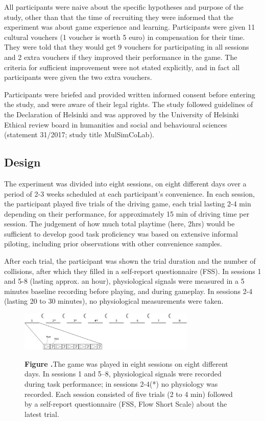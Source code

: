 \documentclass{frontierstyle/frontiersSCNS}
\newcommand{\nicewidth}{0.75\textwidth}
\newcommand{\tapprx}{\raisebox{0.4ex}{\texttildelow}}
\begin{document}
All participants were naive about the specific hypotheses and purpose of the study, other than that the time of recruiting they were informed that the experiment was about game experience and learning. Participants were given 11 cultural vouchers (1 voucher is worth 5 euro) in compensation for their time. They were told that they would get 9 vouchers for participating in all sessions and 2 extra vouchers if they improved their performance in the game. The criteria for sufficient improvement were not stated explicitly, and in fact all participants were given the two extra vouchers.

Participants were briefed and provided written informed consent before entering the study, and were aware of their legal rights. The study followed guidelines of the Declaration of Helsinki and was approved by the University of Helsinki Ethical review board in humanities and social and behavioural sciences (statement 31/2017; study title MulSimCoLab).

\subsection{Design}
The experiment was divided into eight sessions, on eight different days over a period of 2-3 weeks scheduled at each participant's convenience. In each session, the participant played five trials of the driving game, each trial lasting 2-4 min depending on their performance, for approximately 15 min of driving time per session. The judgement of how much total playtime (here, \tapprx2hrs) would be sufficient to develop good task proficiency was based on extensive informal piloting, including prior observations with other convenience samples.

After each trial, the participant was shown the trial duration and the number of collisions, after which they filled in a self-report questionnaire (FSS). In sessions 1 and 5-8 (lasting approx. an hour), physiological signals were measured in a 5 minutes baseline recording before playing, and during gameplay. In sessions 2-4 (lasting 20 to 30 minutes), no physiological measurements were taken.

\begin{figure}[!ht]
\begin{center}
  \includegraphics[width=\nicewidth]{design1}
\end{center}
  \textbf{\label{fig:design} Figure .}{The game was played in eight sessions on eight different days. In sessions 1 and 5--8, physiological signals were recorded during task performance; in sessions 2-4(*) no physiology was recorded. Each session consisted of five trials (2 to 4 min) followed by a self-report questionnaire (FSS, Flow Short Scale) about the latest trial.}
\end{figure}
\end{document}
